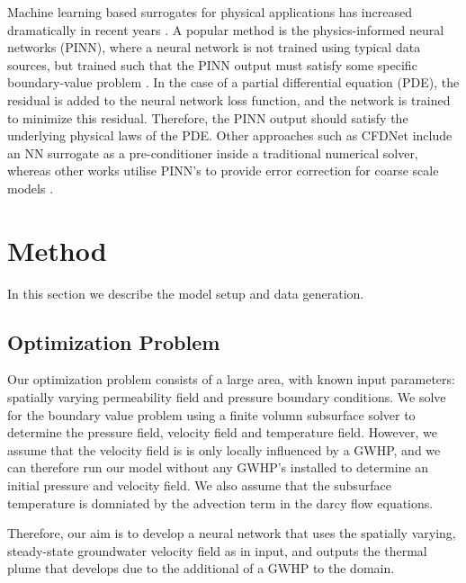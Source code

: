 \documentclass{article} %
\begin{document}
Machine learning based surrogates for physical applications has increased dramatically in recent years \cite{Vinuesa2021,Laubscher2021,Chen2021,Zhu2019}. 
A popular method is the physics-informed neural networks (PINN), where a neural network is not trained using typical data sources, but trained such that the PINN output must satisfy some specific boundary-value problem \cite{pinn}. 
In the case of a partial differential equation (PDE), the residual is added to the neural network loss function, and the network is trained to minimize this residual. Therefore, the PINN output should satisfy the underlying physical laws of the PDE. 
Other approaches such as CFDNet \cite{cfdnet} include an NN surrogate as a pre-conditioner inside a traditional numerical solver, whereas other works utilise PINN's to provide error correction for coarse scale models \cite{Gao2021}.

\section{Method}
\label{sec:method}

In this section we describe the model setup and data generation. 

\subsection{Optimization Problem}

Our optimization problem consists of a large area, with known input parameters: spatially varying permeability field and pressure boundary conditions. 
We solve for the boundary value problem using a finite volumn subsurface solver to determine the pressure field, velocity field and temperature field. 
However, we assume that the velocity field is is only locally influenced by a GWHP, and we can therefore run our model without any GWHP's installed to determine an initial pressure and velocity field.  
We also assume that the subsurface temperature is domniated by the advection term in the darcy flow equations.  

Therefore, our aim is to develop a neural network that uses the spatially varying, steady-state groundwater velocity field as in input, and outputs the thermal plume that develops due to the additional of a GWHP to the domain. 
\end{document}
